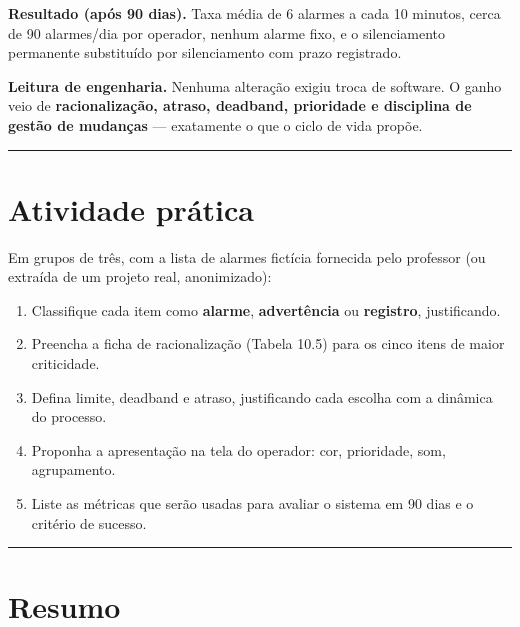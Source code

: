 \textbf{Resultado (após 90 dias).} Taxa média de 6 alarmes a cada 10 minutos, cerca de 90 alarmes/dia por operador, nenhum alarme fixo, e o silenciamento permanente substituído por silenciamento com prazo registrado.

\textbf{Leitura de engenharia.} Nenhuma alteração exigiu troca de software. O ganho veio de \textbf{racionalização, atraso, deadband, prioridade e disciplina de gestão de mudanças} --- exatamente o que o ciclo de vida propõe.

\begin{center}\rule{0.5\linewidth}{0.5pt}\end{center}

\section{Atividade prática}\label{atividade-pruxe1tica}

Em grupos de três, com a lista de alarmes fictícia fornecida pelo professor (ou extraída de um projeto real, anonimizado):

\begin{enumerate}
\def\labelenumi{\arabic{enumi}.}
\tightlist
\item
  Classifique cada item como \textbf{alarme}, \textbf{advertência} ou \textbf{registro}, justificando.
\item
  Preencha a ficha de racionalização (Tabela 10.5) para os cinco itens de maior criticidade.
\item
  Defina limite, deadband e atraso, justificando cada escolha com a dinâmica do processo.
\item
  Proponha a apresentação na tela do operador: cor, prioridade, som, agrupamento.
\item
  Liste as métricas que serão usadas para avaliar o sistema em 90 dias e o critério de sucesso.
\end{enumerate}

\begin{center}\rule{0.5\linewidth}{0.5pt}\end{center}

\section{Resumo}\label{resumo}

